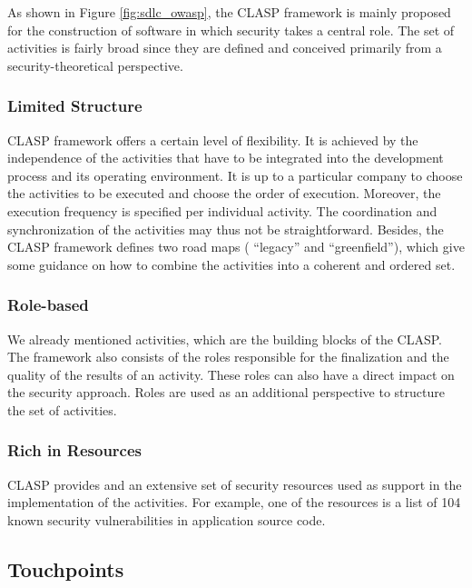 \documentclass[12pt,a4,twoside]{article}
\begin{document}
As shown in Figure \ref{fig:sdlc_owasp}, the CLASP framework is mainly proposed for the construction of software in which security takes a central role. The set of activities is fairly broad since they are defined and conceived primarily from a security-theoretical perspective.

\subsubsection{Limited Structure}

CLASP framework offers a certain level of flexibility. It is achieved by the independence of the activities that have to be integrated into the development process and its operating environment. It is up to a particular company to choose the activities to be executed and choose the order of execution. Moreover, the execution frequency is specified per individual activity. The coordination and synchronization of the activities may thus not be straightforward. Besides, the CLASP framework defines two road maps ( ``legacy'' and ``greenfield''), which give some guidance on how to combine the activities into a coherent and ordered set.

\subsubsection{Role-based}

We already mentioned activities, which are the building blocks of the CLASP. The framework also consists of the roles responsible for the finalization and the quality of the results of an activity. These roles can also have a direct impact on the security approach. Roles are used as an additional perspective to structure the set of activities.

\subsubsection{Rich in Resources}

CLASP provides and an extensive set of security resources used as support in the implementation of the activities. For example, one of the resources is a list of 104 known security vulnerabilities in application source code.

\subsection{Touchpoints \cite{on_secure_software}}
\end{document}
